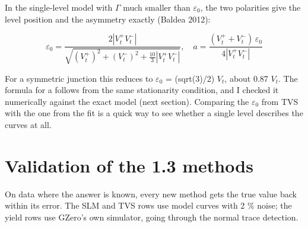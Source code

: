 \documentclass[
  11pt,
  a4paper,
]{article}
\begin{document}
In the single-level model with $\Gamma$ much smaller than
$\varepsilon_0$, the two polarities give the level position and the
asymmetry exactly (Baldea 2012):

\[
\varepsilon_0 = \frac{2|V_t^+ V_t^-|}{\sqrt{(V_t^+)^2 + (V_t^-)^2 + \frac{10}{3}|V_t^+ V_t^-|}}, \quad a = \frac{(V_t^+ + V_t^-)\,\varepsilon_0}{4|V_t^+ V_t^-|}
\]

For a symmetric junction this reduces to $\varepsilon_0$ = (sqrt(3)/2)
$V_t$, about 0.87 $V_t$. The formula for a follows from the same
stationarity condition, and I checked it numerically against the exact
model (next section). Comparing the $\varepsilon_0$ from TVS with the
one from the fit is a quick way to see whether a single level describes
the curves at all.

\hypertarget{validation-of-the-1.3-methods}{%
\section{Validation of the 1.3
methods}\label{validation-of-the-1.3-methods}}

On data where the answer is known, every new method gets the true value
back within its error. The SLM and TVS rows use model curves with 2 \%
noise; the yield rows use GZero's own simulator, going through the
normal trace detection.
\end{document}
